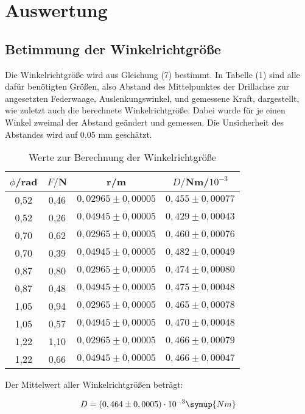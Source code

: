 \section{Auswertung}
\label{sec:Auswertung}

\subsection{Betimmung der Winkelrichtgröße}
Die Winkelrichtgröße wird aus Gleichung (7) bestimmt. In Tabelle (1) sind alle dafür benötigten Größen, also 
Abstand des Mittelpunktes der Drillachse zur angesetzten Federwaage, Auslenkungswinkel, und gemessene Kraft, dargestellt, 
wie zuletzt auch die berechnete Winkelrichtgröße. Dabei wurde für je einen Winkel zweimal der Abstand geändert und
gemessen. Die Unsicherheit des Abstandes wird auf 0.05 mm geschätzt.


\begin{table}[H]
  \centering
  \caption{Werte zur Berechnung der Winkelrichtgröße}
  \label{tab:Parameter}
  \begin{tabular}{c c c c}
    \toprule
    $\phi$/rad & $F/$N & r/m & $D/$Nm/$10^{-3}$\\
    \bottomrule
     0,52 & 0,46  & $0,02965 \pm 0,00005$ & $0,455 \pm 0,00077$ \\
     0,52 & 0,26  & $0,04945 \pm 0,00005$ & $0,429 \pm 0,00043$\\
     0,70 & 0,62  & $0,02965 \pm 0,00005$ & $0,460 \pm 0,00076$\\
     0,70 & 0,39  & $0,04945 \pm 0,00005$ & $0,482 \pm 0,00049$\\
     0,87 & 0,80  & $0,02965 \pm 0,00005$ & $0,474 \pm 0,00080$\\
     0,87 & 0,48  & $0,04945 \pm 0,00005$ & $0,475 \pm 0,00048$\\
     1,05 & 0,94  & $0,02965 \pm 0,00005$ & $0,465 \pm 0,00078$\\
     1,05 & 0,57  & $0,04945 \pm 0,00005$ & $0,470 \pm 0,00048$\\
     1,22 & 1,10  & $0,02965 \pm 0,00005$ & $0,466 \pm 0,00079$\\
     1,22 & 0,66  & $0,04945 \pm 0,00005$ & $0,466 \pm 0,00047$\\
    \bottomrule
  \end{tabular}
\end{table}

Der Mittelwert aller Winkelrichtgrößen beträgt:

\begin{equation}
  D = (0,464 \pm 0,0005)\cdot 10^{-3} \symup{Nm}
\end{equation}






